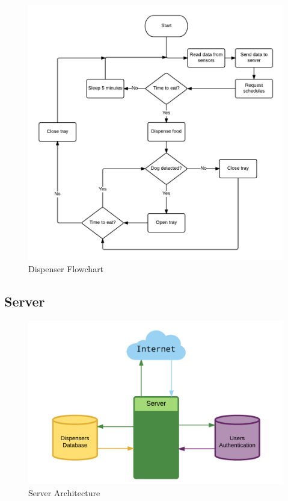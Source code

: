 \documentclass[12pt]{article}
\begin{document}
\begin{figure}[!htb]
  \begin{center}
      \includegraphics[scale=0.4]{Figures/DispenserFlowchart.png}
  \end{center}
  \caption{Dispenser Flowchart}
  \label{fig:DispenserFlowChart}
\end{figure}

\subsection{Server}

\begin{figure}[!htb]
  \includegraphics[width=\textwidth]{Figures/ArchitectureServer}
  \caption{Server Architecture}
  \label{fig:ServArchitecture}
\end{figure}
\end{document}
